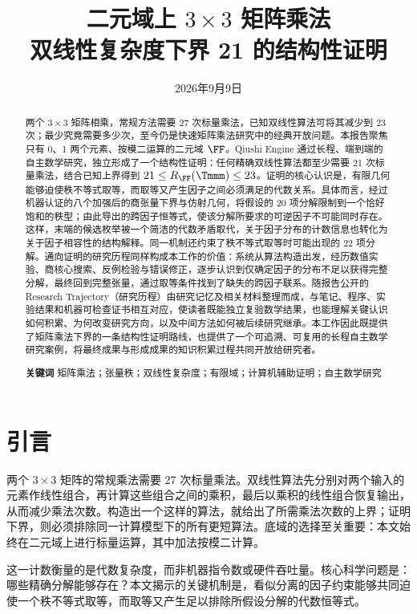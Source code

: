 \documentclass[11pt,a4paper]{article}
\title{二元域上 $3\times3$ 矩阵乘法\\双线性复杂度下界 21 的结构性证明}
\date{2026年9月9日}
\begin{document}
\maketitle
\thispagestyle{plain}
\begin{abstract}
两个 $3\times3$ 矩阵相乘，常规方法需要 27 次标量乘法，已知双线性算法可将其减少到 23 次；最少究竟需要多少次，至今仍是快速矩阵乘法研究中的经典开放问题。本报告聚焦只有 0、1 两个元素、按模二运算的二元域 $\FF$。Qiushi Engine 通过长程、端到端的自主数学研究，独立形成了一个结构性证明：任何精确双线性算法都至少需要 21 次标量乘法，结合已知上界得到 $21\le R_{\FF}(\Tmmm)\le23$。证明的核心认识是，有限几何能够迫使秩不等式取等，而取等又产生因子之间必须满足的代数关系。具体而言，经过机器认证的八个加强后的商张量下界与仿射几何，将假设的 20 项分解限制到一个恰好饱和的秩型；由此导出的跨因子恒等式，使该分解所要求的可逆因子不可能同时存在。这样，末端的候选枚举被一个简洁的代数矛盾取代，关于因子分布的计数信息也转化为关于因子相容性的结构解释。同一机制还约束了秩不等式取等时可能出现的 22 项分解。通向证明的研究历程同样构成本工作的价值：系统从算法构造出发，经历数值实验、商核心搜索、反例检验与错误修正，逐步认识到仅确定因子的分布不足以获得完整分解，最终回到完整张量，通过取等条件找到了缺失的跨因子联系。随报告公开的 Research Trajectory（研究历程）由研究记忆及相关材料整理而成，与笔记、程序、实验结果和机器可检查证书相互对应，使读者既能独立复验数学结果，也能理解关键认识如何积累、为何改变研究方向，以及中间方法如何被后续研究继承。本工作因此既提供了矩阵乘法下界的一条结构性证明路线，也提供了一个可追溯、可复用的长程自主数学研究案例，将最终成果与形成成果的知识积累过程共同开放给研究者。
\par\smallskip\noindent\textbf{关键词}\quad
矩阵乘法；张量秩；双线性复杂度；有限域；计算机辅助证明；自主数学研究
\end{abstract}
{\small{}\tableofcontents\par}
\clearpage

\section{引言}

两个 $3\times3$ 矩阵的常规乘法需要 27 次标量乘法。双线性算法先分别对两个输入的元素作线性组合，再计算这些组合之间的乘积，最后以乘积的线性组合恢复输出，从而减少乘法次数。构造出一个这样的算法，就给出了所需乘法次数的上界；证明下界，则必须排除同一计算模型下的所有更短算法。底域的选择至关重要：本文始终在二元域上进行标量运算，其中加法按模二计算。

这一计数衡量的是代数复杂度，而非机器指令数或硬件吞吐量。核心科学问题是：哪些精确分解能够存在？本文揭示的关键机制是，看似分离的因子约束能够共同迫使一个秩不等式取等，而取等又产生足以排除所假设分解的代数恒等式。
\end{document}
